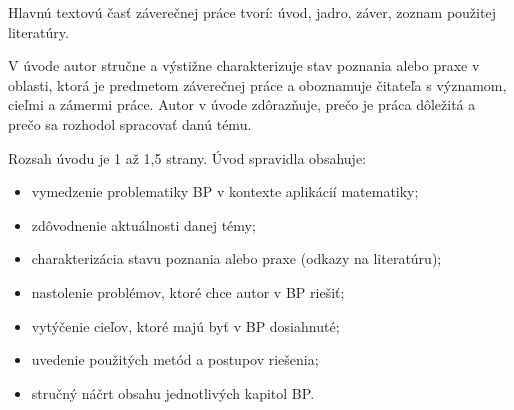 
Hlavnú textovú časť záverečnej práce tvorí: úvod, jadro, záver, zoznam použitej literatúry.

V úvode autor stručne a výstižne charakterizuje stav poznania alebo praxe v oblasti, ktorá je predmetom záverečnej práce a oboznamuje čitateľa s významom, cieľmi a zámermi práce. Autor v úvode zdôrazňuje, prečo je práca dôležitá a prečo sa rozhodol spracovať danú tému. 


Rozsah úvodu je  1 až 1,5 strany.  Úvod spravidla obsahuje: 
\begin{itemize}
\item vymedzenie problematiky BP v kontexte aplikácií matematiky;
\item zdôvodnenie aktuálnosti danej témy;
\item charakterizácia stavu poznania alebo praxe (odkazy na literatúru);
\item nastolenie problémov, ktoré chce autor v BP riešiť;
\item vytýčenie cieľov, ktoré majú byť v BP dosiahnuté;
\item uvedenie použitých metód a postupov riešenia;
\item stručný náčrt obsahu jednotlivých kapitol BP.
\end{itemize}
